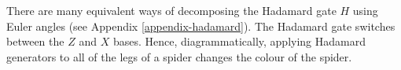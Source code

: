 
There are many equivalent ways of decomposing the Hadamard gate $H$ using Euler angles (see Appendix \ref{appendix-hadamard}). The Hadamard gate switches between the $Z$ and $X$ bases. Hence, diagrammatically, applying Hadamard generators to all of the legs of a spider changes the colour of the spider.










